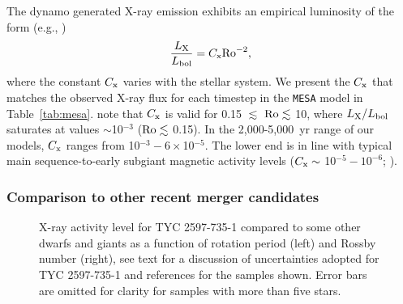 \documentclass[linenumbers]{aastex631}
\begin{document}
The dynamo generated X-ray emission exhibits an empirical luminosity of the form  (e.g., \citealt{Soker&Tylenda2007})
\begin{equation}
\frac{L_{\rm X}}{L_{\rm bol}} = C_{\rm x}{\rm Ro}^{-2},
\end{equation}
where the constant $C_{\rm x}$ varies with the stellar system. We present the $C_{\rm x}$ that matches the observed X-ray flux for each timestep in the \texttt{MESA} model in Table~\ref{tab:mesa}. \citet{Soker&Tylenda2007} note that $C_{\rm x}$ is valid for 0.15 $\lesssim$ ${\rm Ro} \lesssim$ 10, where $L_{\rm X} / L_{\rm bol}$ saturates at values $\sim$10$^{-3}$ (${\rm Ro} \lesssim$ 0.15). In the 2,000-5,000~yr range of our models, $C_{\rm x}$ ranges from 10$^{-3} - 6\times$10$^{-5}$. The lower end is in line with typical main sequence-to-early subgiant magnetic activity levels ($C_{\rm x} \sim$ 10$^{-5}-10^{-6}$; \citealt{Pizzolato+2003, Gondoin+2005}).




\subsubsection{Comparison to other recent merger candidates}
\label{sect:comparison}
\begin{figure}
    \caption{X-ray activity level for TYC 2597-735-1 compared to some other dwarfs and giants as a function of rotation period (left) and Rossby number (right), see text for a discussion of uncertainties adopted for TYC 2597-735-1 and references for the samples shown. Error bars are omitted for clarity for samples with more than five stars.
    \label{fig:lxbol}}
\end{figure}
\end{document}
